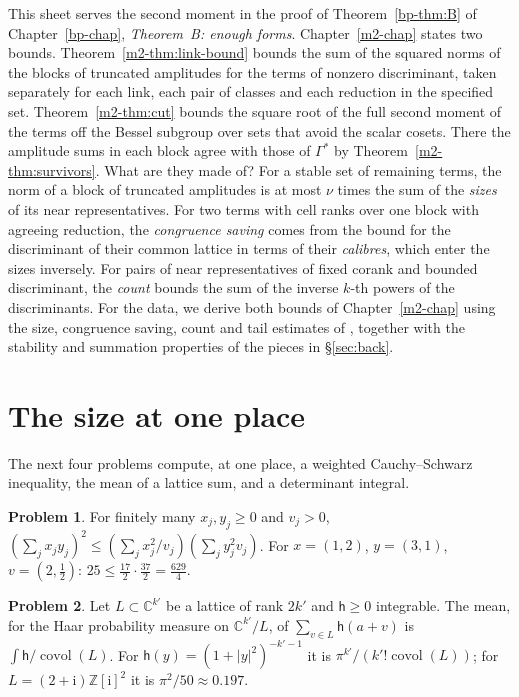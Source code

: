 \documentclass[reqno]{amsart}
\newcounter{chap}
\theoremstyle{definition}
\newtheorem{problem}{Problem}[section]
\theoremstyle{plain}
\theoremstyle{remark}
\newcommand{\Z}{{\mathbb{Z}}}
\newcommand{\C}{{\mathbb{C}}}
\newcommand{\ii}{\mathrm{i}}
\begin{document}
\medskip
This sheet serves the second moment in the proof of Theorem~\ref{bp-thm:B} of Chapter~\ref{bp-chap}, \emph{Theorem~B: enough forms}.  Chapter~\ref{m2-chap} states two bounds.  Theorem~\ref{m2-thm:link-bound} bounds the sum of the squared norms of the blocks of truncated amplitudes for the terms of nonzero discriminant, taken separately for each link, each pair of classes and each reduction in the specified set.  Theorem~\ref{m2-thm:cut} bounds the square root of the full second moment of the terms off the Bessel subgroup over sets that avoid the scalar cosets.  There the amplitude sums in each block agree with those of \(\Gamma^*\) by Theorem~\ref{m2-thm:survivors}.  What are they made of?  For a stable set of remaining terms, the norm of a block of truncated amplitudes is at most \(\nu\) times the sum of the \emph{sizes} of its near representatives.  For two terms with cell ranks over one block with agreeing reduction, the \emph{congruence saving} comes from the bound for the discriminant of their common lattice in terms of their \emph{calibres}, which enter the sizes inversely.  For pairs of near representatives of fixed corank and bounded discriminant, the \emph{count} bounds the sum of the inverse \(k\)-th powers of the discriminants.  For the data, we derive both bounds of Chapter~\ref{m2-chap} using the size, congruence saving, count and tail estimates of \cite{GL}, together with the stability and summation properties of the pieces in \S\ref{sec:back}.

\section{The size at one place}\label{sec:one-place}

The next four problems compute, at one place, a weighted Cauchy--Schwarz inequality, the mean of a lattice sum, and a determinant integral.

\begin{problem}\label{pr:schur}
For finitely many \(x_j,y_j\ge0\) and \(v_j>0\), \((\sum_jx_jy_j)^2\le(\sum_jx_j^2/v_j)(\sum_jy_j^2v_j)\).  For \(x=(1,2)\), \(y=(3,1)\), \(v=(2,\tfrac12)\): \(25\le\tfrac{17}2\cdot\tfrac{37}2=\tfrac{629}4\).
\end{problem}

\begin{problem}\label{pr:mean}
Let \(L\subset\C^{k'}\) be a lattice of rank \(2k'\) and \(\mathsf h\ge0\) integrable.  The mean, for the Haar probability measure on \(\C^{k'}/L\), of \(\sum_{v\in L}\mathsf h(a+v)\) is \(\int\mathsf h/\operatorname{covol}(L)\).  For \(\mathsf h(y)=(1+\lvert y\rvert^2)^{-k'-1}\) it is \(\pi^{k'}/(k'!\operatorname{covol}(L))\); for \(L=(2+\ii)\Z[\ii]^2\) it is \(\pi^2/50\approx0.197\).
\end{problem}
\end{document}
